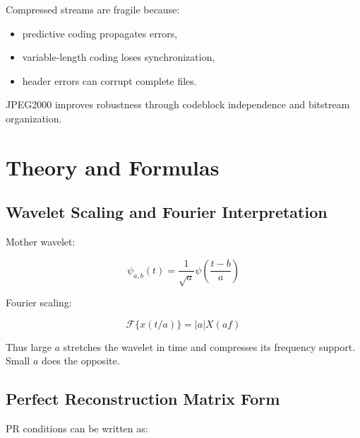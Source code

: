 Compressed streams are fragile because:

\begin{itemize}
  \item predictive coding propagates errors,
  \item variable-length coding loses synchronization,
  \item header errors can corrupt complete files.
\end{itemize}

JPEG2000 improves robustness through codeblock independence and bitstream organization.

\begin{center}
\end{center}

\section{Theory and Formulas}

\subsection{Wavelet Scaling and Fourier Interpretation}

Mother wavelet:

\[
\psi_{a,b}(t)
=
\frac{1}{\sqrt{a}}\psi\left(\frac{t-b}{a}\right)
\]

Fourier scaling:

\[
\mathcal{F}\{x(t/a)\}=|a|X(af)
\]

Thus large $a$ stretches the wavelet in time and compresses its frequency support. Small $a$ does the opposite.

\subsection{Perfect Reconstruction Matrix Form}

PR conditions can be written as:

